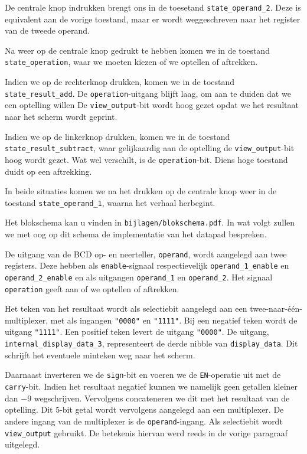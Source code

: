 \documentclass[titlepage]{article}
\begin{document}
De centrale knop indrukken brengt ons in de toesetand \texttt{state\_operand\_2}.
Deze is equivalent aan de vorige toestand, maar er wordt weggeschreven naar het register van de tweede operand.

Na weer op de centrale knop gedrukt te hebben komen we in de toestand \texttt{state\_operation}, waar we moeten kiezen of we optellen of aftrekken.

Indien we op de rechterknop drukken, komen we in de toestand \texttt{state\_result\_add}.
De \texttt{operation}-uitgang blijft laag, om aan te duiden dat we een optelling willen
De \texttt{view\_output}-bit wordt hoog gezet opdat we het resultaat naar het scherm wordt geprint.

Indien we op de linkerknop drukken, komen we in de toestand \texttt{state\_result\_subtract},
waar gelijkaardig aan de optelling de \texttt{view\_output}-bit hoog wordt gezet.
Wat wel verschilt, is de \texttt{operation}-bit.
Diens hoge toestand duidt op een aftrekking.

In beide situaties komen we na het drukken op de centrale knop weer in de toestand \texttt{state\_operand\_1}, waarna het verhaal herbegint.


Het blokschema kan u vinden in \texttt{bijlagen/blokschema.pdf}.
In wat volgt zullen we met oog op dit schema de implementatie van het datapad bespreken.

De uitgang van de BCD op- en neerteller, \texttt{operand}, wordt aangelegd aan twee registers.
Deze hebben als \texttt{enable}-signaal respectievelijk \texttt{operand\_1\_enable} en \texttt{operand\_2\_enable} en als uitgangen \texttt{operand\_1} en \texttt{operand\_2}.
Het signaal \texttt{operation} geeft aan of we optellen of aftrekken.

Het teken van het resultaat wordt als selectiebit aangelegd aan een twee-naar-één-multiplexer, met als ingangen \texttt{"0000"} en \texttt{"1111"}.
Bij een negatief teken wordt de uitgang \texttt{"1111"}. Een positief teken levert de uitgang \texttt{"0000"}.
De uitgang, \texttt{internal\_display\_data\_3}, representeert de derde nibble van \texttt{display\_data}.
Dit schrijft het eventuele minteken weg naar het scherm.

Daarnaast inverteren we de \texttt{sign}-bit en voeren we de \texttt{EN}-operatie uit met de \texttt{carry}-bit.
Indien het resultaat negatief kunnen we namelijk geen getallen kleiner dan \(-9\) wegschrijven.
Vervolgens concateneren we dit met het resultaat van de optelling.
Dit 5-bit getal wordt vervolgens aangelegd aan een multiplexer.
De andere ingang van de multiplexer is de \texttt{operand}-ingang.
Als selectiebit wordt \texttt{view\_output} gebruikt.
De betekenis hiervan werd reeds in de vorige paragraaf uitgelegd.
\end{document}
